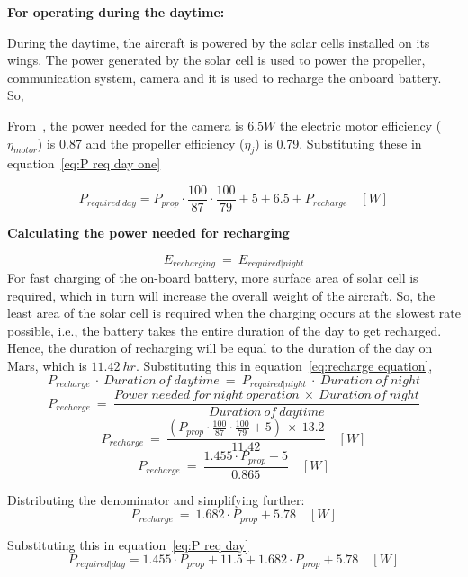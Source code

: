 \p \textbf{For operating during the daytime:}

\p During the daytime, the aircraft is powered by the solar cells installed on its wings. The power generated by the solar cell is used to power the propeller, communication system, camera and it is used to recharge the onboard battery.\\
\p So,

\p From~\cite{Manual}, the power needed for the camera is $6.5 W$ the electric motor efficiency ($\eta_{motor}$) is 0.87 and the propeller efficiency ($\eta_j$) is 0.79. Substituting these in equation~\ref{eq:P req day one}

\[ P_{required|day} = P_{prop} \cdot \frac{100}{87} \cdot \frac{100}{79} + 5 + 6.5 + P_{recharge} \quad [W] \]

\textbf{Calculating the power needed for recharging}

\vspace{0.2cm}

\[ E_{recharging} \ = \ E_{required|night} \]
\p For fast charging of the on-board battery, more surface area of solar cell is required, which in turn will increase the overall weight of the aircraft. So, the least area of the solar cell is required when the charging occurs at the slowest rate possible, i.e., the battery takes the entire duration of the day to get recharged. Hence, the duration of recharging will be equal to the duration of the day on Mars, which is $ 11.42 \ hr $. Substituting this in equation~\ref{eq:recharge equation},
\[ P_{recharge} \ \cdot \ Duration \ of \ daytime \ = \ P_{required | night} \ \cdot \ Duration \ of \ night \]
\[ P_{recharge} \ = \ \frac{ Power \ needed \ for \ night \ operation \ \times \ Duration \ of \ night }{ Duration \ of \ daytime } \]
\[ P_{recharge} \ = \ \frac{ \left(P_{prop} \cdot \frac{100}{87} \cdot \frac{100}{79} + 5 \right) \ \times \ 13.2 }{ 11.42 } \quad [W] \]
\[ P_{recharge} \ = \ \frac{ 1.455 \cdot P_{prop} + 5 }{ 0.865 } \quad [W] \]

\p Distributing the denominator and simplifying further:
\[ P_{recharge} \ = \ 1.682 \cdot P_{prop} + 5.78 \quad [W] \]

\p Substituting this in equation~\ref{eq:P req day}
\[ P_{required|day} = 1.455 \cdot P_{prop} + 11.5 + 1.682 \cdot P_{prop} + 5.78 \quad [W] \]

